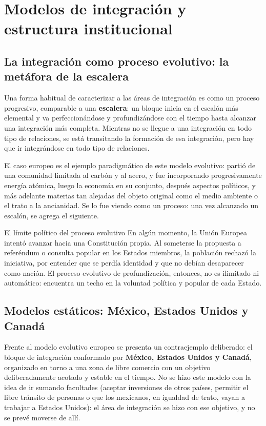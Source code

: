 \documentclass[12pt,oneside]{book}
\begin{document}
\chapter{Modelos de integración y estructura institucional}

\section{La integración como proceso evolutivo: la metáfora de la escalera}

Una forma habitual de caracterizar a las áreas de integración es como un proceso progresivo, comparable a una \textbf{escalera}: un bloque inicia en el escalón más elemental y va perfeccionándose y profundizándose con el tiempo hasta alcanzar una integración más completa. Mientras no se llegue a una integración en todo tipo de relaciones, se está transitando la formación de esa integración, pero hay que ir integrándose en todo tipo de relaciones.

El caso europeo es el ejemplo paradigmático de este modelo evolutivo: partió de una comunidad limitada al carbón y al acero, y fue incorporando progresivamente energía atómica, luego la economía en su conjunto, después aspectos políticos, y más adelante materias tan alejadas del objeto original como el medio ambiente o el trato a la ancianidad. Se lo fue viendo como un proceso: una vez alcanzado un escalón, se agrega el siguiente.

\begin{example}{El límite político del proceso evolutivo}
En algún momento, la Unión Europea intentó avanzar hacia una Constitución propia. Al someterse la propuesta a referéndum o consulta popular en los Estados miembros, la población rechazó la iniciativa, por entender que se perdía identidad y que no debían desaparecer como nación. El proceso evolutivo de profundización, entonces, no es ilimitado ni automático: encuentra un techo en la voluntad política y popular de cada Estado.
\end{example}

\section{Modelos estáticos: México, Estados Unidos y Canadá}

Frente al modelo evolutivo europeo se presenta un contraejemplo deliberado: el bloque de integración conformado por \textbf{México, Estados Unidos y Canadá}, organizado en torno a una zona de libre comercio con un objetivo deliberadamente acotado y estable en el tiempo. No se hizo este modelo con la idea de ir sumando facultades (aceptar inversiones de otros países, permitir el libre tránsito de personas o que los mexicanos, en igualdad de trato, vayan a trabajar a Estados Unidos): el área de integración se hizo con ese objetivo, y no se prevé moverse de allí.
\end{document}
